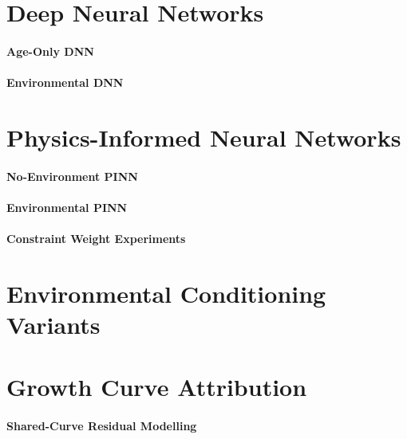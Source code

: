 \documentclass[logo,msc]{Original/infthesis}           %
\begin{document}
\section{Deep Neural Networks}

\paragraph{Age-Only DNN}

\paragraph{Environmental DNN}

\section{Physics-Informed Neural Networks}

\paragraph{No-Environment PINN}

\paragraph{Environmental PINN}

\paragraph{Constraint Weight Experiments}

\section{Environmental Conditioning Variants}

\section{Growth Curve Attribution}

\paragraph{Shared-Curve Residual Modelling}
\end{document}
